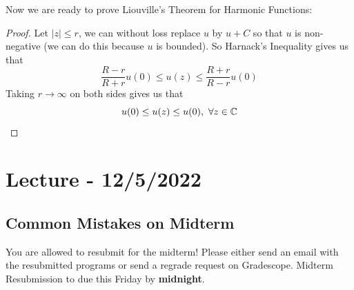 \documentclass{article}
\begin{document}
Now we are ready to prove Liouville's Theorem for Harmonic Functions:

\begin{proof}
    Let $|z| \leq r$, we can without loss replace $u$ by $u + C$ so that $u$ is non-negative (we can do this because $u$ is bounded). So Harnack's Inequality gives us that
    \[\frac{R - r}{R + r} u(0) \leq u(z) \leq \frac{R + r}{R - r} u(0)\]
    Taking $r \to \infty$ on both sides gives us that
    \[u(0) \leq u(z) \leq u(0),\ \forall z \in \mathbb{C}\]
\end{proof}

\section{Lecture - 12/5/2022}

\subsection{Common Mistakes on Midterm}

You are allowed to resubmit for the midterm! Please either send an email with the resubmitted programs or send a regrade request on Gradescope. Midterm Resubmission to due this Friday by \textbf{midnight}.\\
\end{document}
